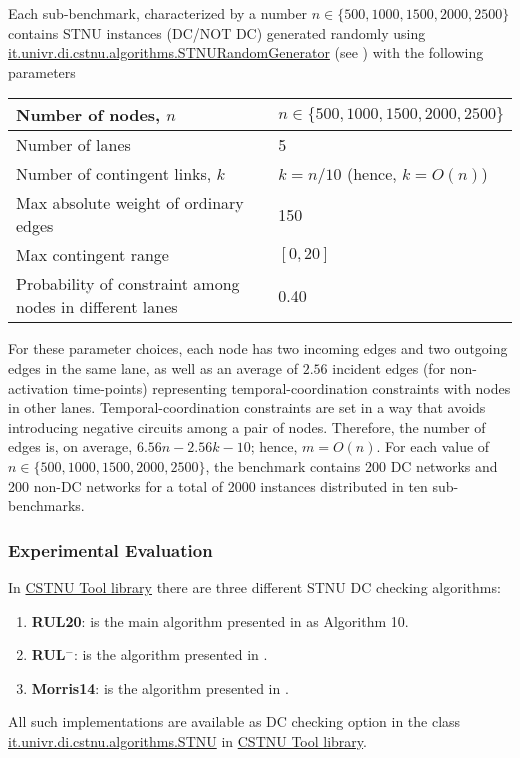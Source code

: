 \documentclass[a4paper,11pt]{article}
\begin{document}
Each sub-benchmark, characterized by a number $n\in\{500,1000,1500,2000,2500\}$ contains STNU instances (DC\slash NOT DC) generated randomly using \href{http://profs.scienze.univr.it/~posenato/software/cstnu/apidocs/it/univr/di/cstnu/algorithms/STNURandomGenerator.html}{it.univr.di.cstnu.algorithms.STNURandomGenerator}
(see ) with the following parameters
\begin{center}\begin{tabular}{|p{2.5in}|p{5.5cm}|} \hline
Number of nodes, $n$ & $n \in \{500, 1000, 1500, 2000, 2500\}$ \\ \hline
Number of lanes & 5\\ \hline
Number of contingent links, $k$ & $k = n / 10$ (hence, $k = O(n)$) \\ \hline
Max absolute weight of ordinary edges & 150 \\ \hline
Max contingent range & $[0,20]$ \\ \hline
Probability of constraint among nodes in different lanes & 0.40 \\ \hline
\end{tabular}\end{center}
For these parameter choices, each node has two incoming edges and two outgoing edges in the same lane, as well as an average of $2.56$ incident edges (for non-activation time-points) representing temporal-coordination constraints with 
nodes in other lanes.
Temporal-coordination constraints are set in a way that avoids introducing negative circuits among a pair of nodes.  
Therefore, the number of edges is, on average,  $6.56 n - 2.56 k - 10$; hence, $m = O(n)$.
For each value of $n \in \{500, 1000, 1500, 2000, 2500\}$, the benchmark contains 200 DC networks and 200 non-DC networks for a total of 2000 instances distributed in ten sub-benchmarks.


\newcommand{\rulTwenty}{RUL20}
\newcommand{\RULminus}{RUL$^-$}
\newcommand{\rulEighteen}{\RULminus}
\newcommand{\morrisFourteen}{Morris14}
\subsubsection{Experimental Evaluation}

In \href{http://profs.scienze.univr.it/~posenato/software/cstnu/}{CSTNU Tool library} there are three different STNU DC checking algorithms:
\begin{enumerate}
	\item \textbf{\rulTwenty}: is the main algorithm presented in \cite{HunsbergerPTR21} as Algorithm 10.
	\item \textbf{\RULminus}: is the algorithm presented in \cite{CairoHR18}. 
	\item \textbf{\morrisFourteen}: is the algorithm presented in \cite{Morris14}.
\end{enumerate}
All such implementations are available as DC checking option in the class 
\href{http://profs.scienze.univr.it/~posenato/software/cstnu/apidocs/it/univr/di/cstnu/algorithms/STNU.html}{it.univr.di.cstnu.algorithms.STNU} in \href{http://profs.scienze.univr.it/~posenato/software/cstnu/}{CSTNU Tool library}.
\end{document}
